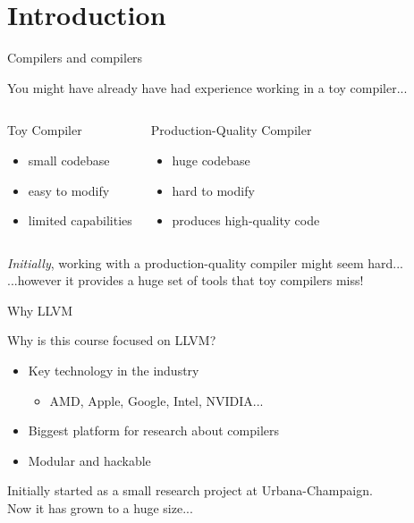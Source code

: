 
\section{Introduction}


\begin{frame}{Compilers and compilers}
\begin{center}
You might have already have had experience working in a \alert{toy compiler}... 

\begin{columns}[t]

\begin{block}{Toy Compiler}
\begin{itemize}
\item small codebase
\item easy to modify
\item limited capabilities
\end{itemize}
\end{block}

\begin{block}{Production-Quality Compiler}
\begin{itemize}
\item huge codebase
\item hard to modify
\item produces high-quality code
\end{itemize}
\end{block}

\end{columns}
\bigskip
\emph{Initially}, working with a production-quality compiler might seem \alert{hard}...\\
\medskip
...however it provides a huge set of tools that toy compilers \alert{miss}!
\end{center}
\end{frame}


\begin{frame}{Why LLVM}
\begin{center}
Why is this course focused on LLVM?\\
\end{center}
\begin{itemize}
\item Key technology in the \alert{industry}
	\begin{itemize}
	\item AMD, Apple, Google, Intel, NVIDIA...
	\end{itemize}
\item Biggest platform for \alert{research} about compilers
\item \alert{Modular} and \alert{hackable}
\end{itemize}
\bigskip
\begin{center}
Initially started as a small research project at Urbana-Champaign.\\
\medskip
Now it has grown to a huge size...
\end{center}
\end{frame}


